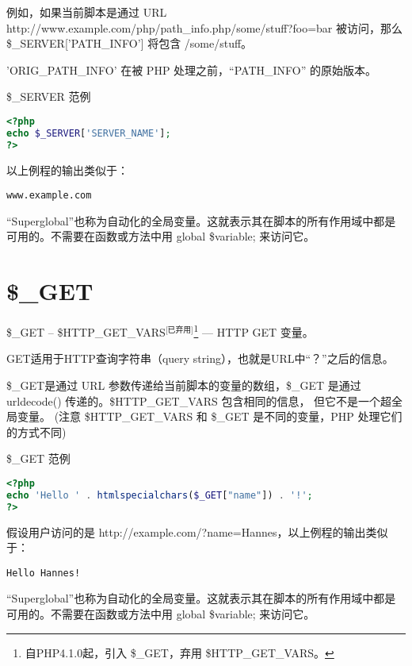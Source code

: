 \begin{compactitem}
例如，如果当前脚本是通过 URL http://www.example.com/php/path\_info.php/some/stuff?foo=bar 被访问，那么 \$\_SERVER['PATH\_INFO'] 将包含 /some/stuff。
\item 'ORIG\_PATH\_INFO'
在被 PHP 处理之前，“PATH\_INFO” 的原始版本。
\end{compactitem}

\begin{example}
\$\_SERVER 范例
\begin{lstlisting}[language=PHP]
<?php
echo $_SERVER['SERVER_NAME'];
?>
\end{lstlisting}
\end{example}

以上例程的输出类似于：

\begin{verbatim}
www.example.com
\end{verbatim}

“Superglobal”也称为自动化的全局变量。这就表示其在脚本的所有作用域中都是可用的。不需要在函数或方法中用 global \$variable; 来访问它。


\section{\$\_GET}



\$\_GET -- \$HTTP\_GET\_VARS$^{\text{[已弃用]}}$\footnote{自PHP4.1.0起，引入 \$\_GET，弃用 \$HTTP\_GET\_VARS。} — HTTP GET 变量。

GET适用于HTTP查询字符串（query string），也就是URL中“？”之后的信息。

\$\_GET是通过 URL 参数传递给当前脚本的变量的数组，\$\_GET 是通过 urldecode() 传递的。\$HTTP\_GET\_VARS 包含相同的信息， 但它不是一个超全局变量。 (注意 \$HTTP\_GET\_VARS 和 \$\_GET 是不同的变量，PHP 处理它们的方式不同)

\begin{example}
\$\_GET 范例
\begin{lstlisting}[language=PHP]
<?php
echo 'Hello ' . htmlspecialchars($_GET["name"]) . '!';
?>
\end{lstlisting}
\end{example}

假设用户访问的是 http://example.com/?name=Hannes，以上例程的输出类似于：

\begin{verbatim}
Hello Hannes!
\end{verbatim}


“Superglobal”也称为自动化的全局变量。这就表示其在脚本的所有作用域中都是可用的。不需要在函数或方法中用 global \$variable; 来访问它。



